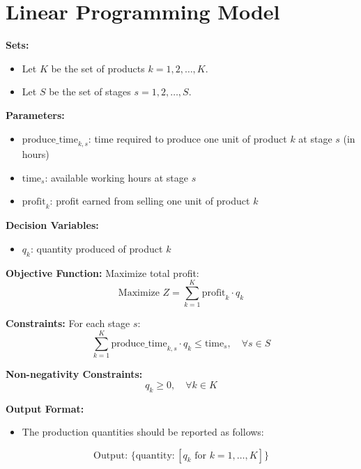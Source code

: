 \documentclass{article}
\begin{document}
\section*{Linear Programming Model}

\textbf{Sets:}
\begin{itemize}
    \item Let \( K \) be the set of products \( k = 1, 2, \ldots, K \).
    \item Let \( S \) be the set of stages \( s = 1, 2, \ldots, S \).
\end{itemize}

\textbf{Parameters:}
\begin{itemize}
    \item \( \text{produce\_time}_{k, s} \): time required to produce one unit of product \( k \) at stage \( s \) (in hours)
    \item \( \text{time}_{s} \): available working hours at stage \( s \)
    \item \( \text{profit}_{k} \): profit earned from selling one unit of product \( k \)
\end{itemize}

\textbf{Decision Variables:}
\begin{itemize}
    \item \( q_{k} \): quantity produced of product \( k \)
\end{itemize}

\textbf{Objective Function:}
Maximize total profit:
\[
\text{Maximize } Z = \sum_{k=1}^{K} \text{profit}_{k} \cdot q_{k}
\]

\textbf{Constraints:}
For each stage \( s \):
\[
\sum_{k=1}^{K} \text{produce\_time}_{k, s} \cdot q_{k} \leq \text{time}_{s}, \quad \forall s \in S
\]

\textbf{Non-negativity Constraints:}
\[
q_{k} \geq 0, \quad \forall k \in K
\]

\textbf{Output Format:}
\begin{itemize}
    \item The production quantities should be reported as follows:
\end{itemize}
\[
\text{Output: } \{ \text{quantity}: [q_{k} \text{ for } k = 1, \ldots, K] \}
\]
\end{document}
